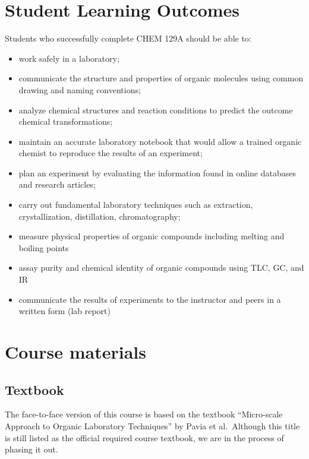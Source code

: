 \hypertarget{sec:slo}{%
\section{Student Learning Outcomes}\label{sec:slo}}

Students who successfully complete CHEM 129A should be able to:

\begin{itemize}
\tightlist
\item
  work safely in a laboratory;
\item
  communicate the structure and properties of organic molecules using
  common drawing and naming conventions;
\item
  analyze chemical structures and reaction conditions to predict the
  outcome chemical transformations;
\item
  maintain an accurate laboratory notebook that would allow a trained
  organic chemist to reproduce the results of an experiment;
\item
  plan an experiment by evaluating the information found in online
  databases and research articles;
\item
  carry out fundamental laboratory techniques such as extraction,
  crystallization, distillation, chromatography;
\item
  measure physical properties of organic compounds including melting and
  boiling points
\item
  assay purity and chemical identity of organic compounds using TLC, GC,
  and IR
\item
  communicate the results of experiments to the instructor and peers in
  a written form (lab report)
\end{itemize}

\hypertarget{sec:course-materials}{%
\section{Course materials}\label{sec:course-materials}}

\hypertarget{sec:textbook}{%
\subsection{Textbook}\label{sec:textbook}}

The face-to-face version of this course is based on the textbook
``Micro-scale Approach to Organic Laboratory Techniques'' by Pavia et
al.~Although this title is still listed as the official required course
textbook, we are in the process of phasing it out.

